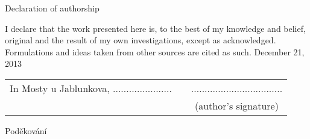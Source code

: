 \newcommand{\odsaditodzhora}{\hskip1pt\vfill}

\odsaditodzhora
\noindent Declaration of authorship

I declare that the work presented here is, to the best of my knowledge and
belief, original and the result of my own investigations, except as acknowledged.
Formulations and ideas taken from other sources are cited as such.
 December 21, 2013

\begin{flushleft}
\begin{tabular}{cp{}c}
In Mosty u Jablunkova, ......................
& 
&
..................................
\\
&&
(author’s signature)
\end{tabular}

\end{flushleft}
\newpage

\odsaditodzhora
\noindent Poděkování


\newpage
